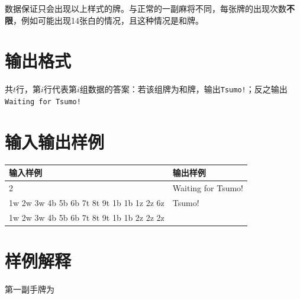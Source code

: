 \documentclass[
	lang=cn,
	color=green
]{elegantbook}
\begin{document}
数据保证只会出现以上样式的牌。与正常的一副麻将不同，每张牌的出现次数\textbf{不限}，例如可能出现14张白的情况，且这种情况是和牌。

\section*{输出格式}
共$t$行，第$i$行代表第$i$组数据的答案：若该组牌为和牌，输出\lstinline{Tsumo!}；反之输出\lstinline{Waiting for Tsumo!}

\section*{输入输出样例}
\begin{tabularx}{450pt}{X|X}
	\toprule
	输入样例                                  & 输出样例           \\
	\midrule
	2                                         & Waiting for Tsumo! \\
	1w 2w 3w 4b 5b 6b 7t 8t 9t 1b 1b 1z 2z 6z & Tsumo!             \\
	1w 2w 3w 4b 5b 6b 7t 8t 9t 1b 1b 2z 2z 2z &                    \\
	\bottomrule
\end{tabularx}

\section*{样例解释}

第一副手牌为
\end{document}

